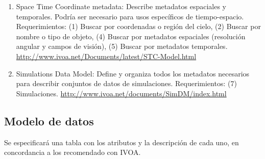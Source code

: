 \begin{enumerate}
	\item Space Time Coordinate metadata: Describe metadatos espaciales y
temporales. Podría ser necesario para usos específicos de tiempo-espacio.
Requerimientos: (1) Buscar por coordenadas o región del cielo, (2) Buscar por
nombre o  tipo de objeto, (4) Buscar por metadatos espaciales (resolución
angular y campos de visión), (5) Buscar por metadatos temporales.
\url{http://www.ivoa.net/Documents/latest/STC-Model.html}

	\item Simulations Data Model: Define y organiza todos los metadatos
necesarios para describir conjuntos de datos de simulaciones. Requerimientos:
(7) Simulaciones. \url{http://www.ivoa.net/documents/SimDM/index.html}
\end{enumerate}

\subsection{Modelo de datos}

Se especificará una tabla con los atributos y la descripción de cada uno, en
concordancia a los recomendado con IVOA.

